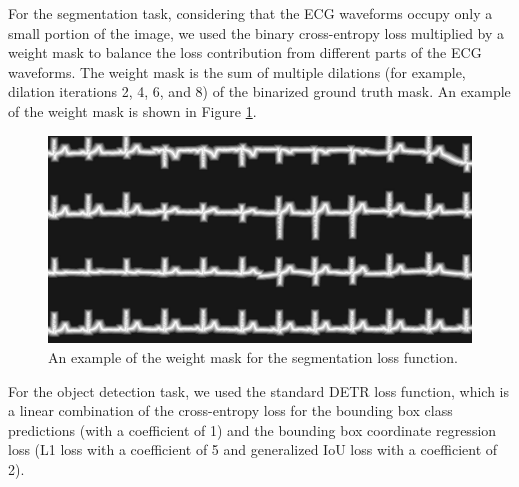 For the segmentation task, considering that the ECG waveforms occupy only a small portion of the image, we used the binary cross-entropy loss multiplied by a weight mask to balance the loss contribution from different parts of the ECG waveforms. The weight mask is the sum of multiple dilations (for example, dilation iterations 2, 4, 6, and 8) of the binarized ground truth mask. An example of the weight mask is shown in Figure \ref{fig:weight-mask}.

\begin{figure}[!htp]
\centering
\includegraphics[width=\linewidth]{images/weight-mask.pdf}
\caption{An example of the weight mask for the segmentation loss function.}
\label{fig:weight-mask}
\end{figure}

For the object detection task, we used the standard DETR loss function, which is a linear combination of the cross-entropy loss for the bounding box class predictions (with a coefficient of 1) and the bounding box coordinate regression loss (L1 loss with a coefficient of 5 and generalized IoU loss with a coefficient of 2).


